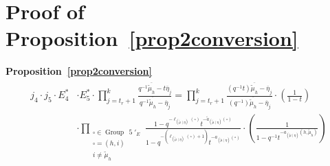 \documentclass[ALCO]{cedram}
\newcommand{\mutilde}{{\widetilde{\mu}}}
\newcommand{\mutildeeta}{{(\mutilde \mid \eta)}}
\newcommand{\leg}[1]{{\ell_{#1}(\square)}}
\newcommand{\armone}[1]{{\widetilde{a}_{#1}(\square)}}
\newcommand{\armtwo}[1]{{a_{#1}(\square)}}
\newcommand{\group}[1]{\operatorname{Group}\,\operatorname{#1}}
\newcommand{\jfour}{j_4}
\newcommand{\jfive}{j_5}
\newcommand{\Estarfour}{E^*_4}
\newcommand{\Estarfive}{E^*_5}
\begin{document}
\section{Proof of Proposition~\ref{prop2conversion}}\label{SecondSimplification}
\textbf{Proposition~\ref{prop2conversion}}
\begin{align*} \begin{split}
\jfour \cdot \jfive \cdot  \Estarfour &\cdot \Estarfive \cdot \prod_{j=t_r+1}^k \frac{q^{-1} \overline{\mutilde_h} -t\overline{\eta}_j}{q^{-1} \overline{\mutilde_h} -\overline{\eta}_j} = \prod_{j=t_r+1}^k \frac{(q^{-1}t) \overline{\mutilde_h} -\overline{\eta}_j}{(q^{-1}) \overline{\mutilde_h} -\overline{\eta}_j} \cdot \left(\frac{1}{1-t}\right) \\ &\cdot \prod\limits_{\substack{\square \in \group{5}'_E  \\ \square = (h,i) \\ i\neq \mutilde_h}} \frac{1-q^{-\leg{\mutildeeta}}t^{-\armone{\mutildeeta}}}{1-q^{-(\leg{\mutildeeta}+1)}t^{-\armtwo{\mutildeeta}}}  \cdot \left(\frac{1}{1-q^{-1}t^{-a_\mutildeeta(h,\mutilde_h)}}\right)\end{split}\end{align*}
\end{document}
